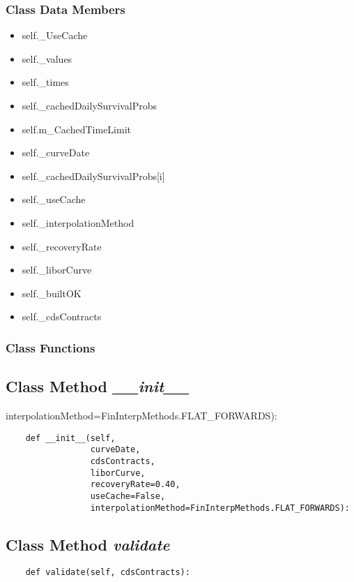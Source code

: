 \documentclass[twoside,11pt]{book}
\begin{document}
\subsubsection{Class Data Members}
\begin{itemize}
\item{self.\_UseCache}
\item{self.\_values}
\item{self.\_times}
\item{self.\_cachedDailySurvivalProbs}
\item{self.m\_CachedTimeLimit}
\item{self.\_curveDate}
\item{self.\_cachedDailySurvivalProbs[i]}
\item{self.\_useCache}
\item{self.\_interpolationMethod}
\item{self.\_recoveryRate}
\item{self.\_liborCurve}
\item{self.\_builtOK}
\item{self.\_cdsContracts}
\end{itemize}

\subsubsection{Class Functions}

\subsection{Class Method {\it \_\_init\_\_}}
interpolationMethod=FinInterpMethods.FLAT\_FORWARDS):

\begin{lstlisting}
    def __init__(self,
                 curveDate,
                 cdsContracts,
                 liborCurve,
                 recoveryRate=0.40,
                 useCache=False,
                 interpolationMethod=FinInterpMethods.FLAT_FORWARDS):
\end{lstlisting}

\subsection{Class Method {\it validate}}


\begin{lstlisting}
    def validate(self, cdsContracts):
\end{lstlisting}
\end{document}
